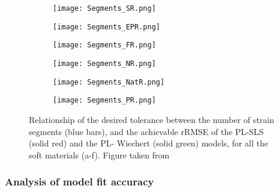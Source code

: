 \begin{figure}[htb!]
    \centering
    \begin{subfigure}[b]{0.49\textwidth}
        \centering
        \texttt{[image: Segments\_SR.png]}
        \caption{}
        \label{fig:SegmentsSR}
    \end{subfigure}
    \begin{subfigure}[b]{0.49\textwidth}
        \centering
        \texttt{[image: Segments\_EPR.png]}
        \caption{}
        \label{fig:SegmentsEPR}
    \end{subfigure}
    \begin{subfigure}[b]{0.49\textwidth}
        \centering
        \texttt{[image: Segments\_FR.png]}
        \caption{}
        \label{fig:SegmentsFR}
    \end{subfigure}
    \begin{subfigure}[b]{0.49\textwidth}
        \centering
        \texttt{[image: Segments\_NR.png]}
        \caption{}
        \label{fig:SegmentsNR}
    \end{subfigure}
    \begin{subfigure}[b]{0.49\textwidth}
        \centering
        \texttt{[image: Segments\_NatR.png]}
        \caption{}
        \label{fig:SegmentsNatR}
    \end{subfigure}
    \begin{subfigure}[b]{0.49\textwidth}
        \centering
        \texttt{[image: Segments\_PR.png]}
        \caption{}
        \label{fig:SegmentsPR}
    \end{subfigure}
    \caption{Relationship of the desired tolerance between the number of strain segments (blue bars), and the achievable rRMSE of the PL-SLS (solid red) and the PL- Wiechert (solid green) models, for all the soft materials (a-f). Figure taken from \cite{solis2018assessment}}
    \label{fig:SegmentsAll}
\end{figure}

\subsubsection{Analysis of model fit accuracy} \label{ModelfitAnalysis}

